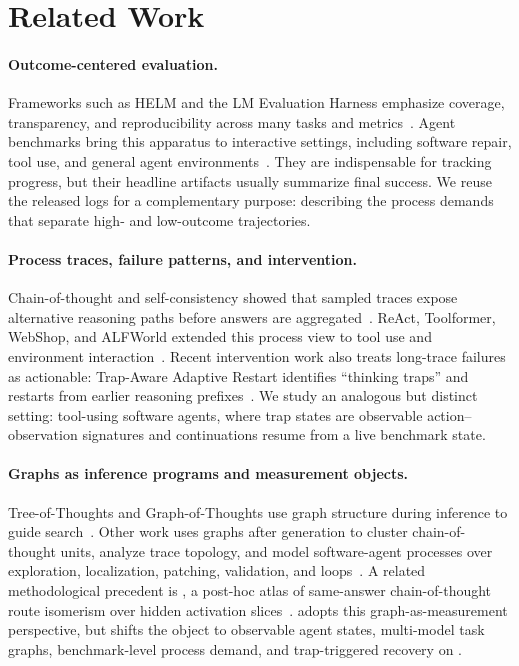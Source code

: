 \section{Related Work}
\label{sec:related_work}

\paragraph{Outcome-centered evaluation.}
Frameworks such as HELM and the LM Evaluation Harness emphasize coverage, transparency, and reproducibility across many tasks and metrics~\citep{liang2023helm,gao2023lmeval}.
Agent benchmarks bring this apparatus to interactive settings, including software repair, tool use, and general agent environments~\citep{jimenez2024swebench,liu2024agentbench,yao2025taubench}.
They are indispensable for tracking progress, but their headline artifacts usually summarize final success.
We reuse the released logs for a complementary purpose: describing the process demands that separate high- and low-outcome trajectories.

\paragraph{Process traces, failure patterns, and intervention.}
Chain-of-thought and self-consistency showed that sampled traces expose alternative reasoning paths before answers are aggregated~\citep{wei2022cot,wang2023selfconsistency}.
ReAct, Toolformer, WebShop, and ALFWorld extended this process view to tool use and environment interaction~\citep{yao2023react,schick2023toolformer,yao2022webshop,shridhar2021alfworld}.
Recent intervention work also treats long-trace failures as actionable: Trap-Aware Adaptive Restart identifies ``thinking traps'' and restarts from earlier reasoning prefixes~\citep{chen2026taar}.
We study an analogous but distinct setting: tool-using software agents, where trap states are observable action--observation signatures and continuations resume from a live benchmark state.

\paragraph{Graphs as inference programs and measurement objects.}
Tree-of-Thoughts and Graph-of-Thoughts use graph structure during inference to guide search~\citep{yao2023tree,besta2024graph}.
Other work uses graphs after generation to cluster chain-of-thought units, analyze trace topology, and model software-agent processes over exploration, localization, patching, validation, and loops~\citep{xiong2025mapping,tan2025shape,liu2026graphectory}.
A related methodological precedent is \sg{}, a post-hoc atlas of same-answer chain-of-thought route isomerism over hidden activation slices~\citep{chen2026slicegraph}.
\method{} adopts this graph-as-measurement perspective, but shifts the object to observable agent states, multi-model task graphs, benchmark-level process demand, and trap-triggered recovery on \swe{}.
